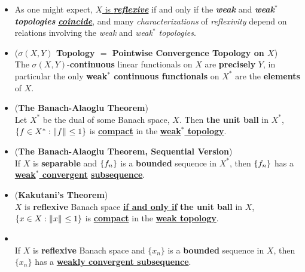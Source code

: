 \documentclass[11pt]{article}
\begin{document}
\begin{itemize}
\item \begin{remark}
As one might expect, \underline{$X$ is \emph{\textbf{reflexive}}} if and only if the \emph{\textbf{weak}} and \emph{\textbf{weak$^{*}$ topologies}} \underline{\emph{\textbf{coincide}}}, and many \emph{characterizations} of \emph{reflexivity} depend on relations involving the \emph{weak} and \emph{weak$^{*}$ topologies}.
\end{remark}

\item \begin{proposition} (\textbf{$\sigma(X, Y)$ Topology $=$ Pointwise Convergence Topology on $X$}) \citep{reed1980methods} \\
The $\sigma(X, Y)$-\textbf{continuous} linear functionals on $X$ are \textbf{precisely} $Y$, in particular the only \textbf{weak$^{*}$ continuous functionals} on $X^{*}$ are  the \textbf{elements} of $X$. 
\end{proposition}

\item \begin{theorem} (\textbf{The Banach-Alaoglu Theorem}) \citep{reed1980methods}\\
 Let $X^{*}$ be the dual of some Banach space, $X$. Then \textbf{the unit ball} in $X^{*}$, $\left\{f \in X^{*}: \left\|f\right\|_{}\le 1\right\}$ is \underline{\textbf{compact}} in the \underline{\textbf{weak$^{*}$ topology}}.
\end{theorem}

\item \begin{corollary} (\textbf{The Banach-Alaoglu Theorem, Sequential Version}) \citep{rynne2007linear}\\
If $X$ is \textbf{separable} and $\left\{f_n\right\}$ is a \textbf{bounded} sequence in $X^{*}$, then  $\left\{f_n\right\}$ has a \textbf{\underline{weak$^{*}$ convergent} \underline{subsequence}}.
\end{corollary}

\item \begin{theorem}(\textbf{Kakutani's Theorem}) \citep{rynne2007linear}\\
$X$ is \textbf{reflexive} Banach space \underline{\textbf{if and only if}} \textbf{the unit ball} in $X$, $\left\{x \in X: \left\|x\right\|_{}\le 1\right\}$ is \underline{\textbf{compact}} in the \underline{\textbf{weak topology}}.
\end{theorem}

\item \begin{corollary} \citep{rynne2007linear}\\
If $X$ is \textbf{reflexive} Banach space and $\{x_n\}$ is a \textbf{bounded} sequence in $X$, then $\{x_n\}$ has a \textbf{\underline{weakly convergent subsequence}}.
\end{corollary}


\end{itemize}
\end{document}

